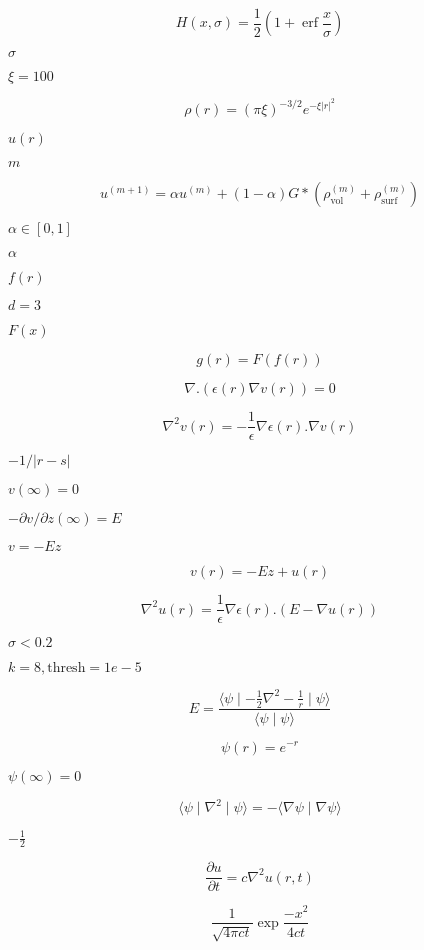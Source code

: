 \documentclass{article}
\begin{document}
\[ H(x,\sigma) = \frac{1}{2} \left( 1 + \mathop{\mathrm{erf}} \frac{x}{\sigma} \right) \]
\pagebreak

$\sigma$
\pagebreak

$\xi=100$
\pagebreak

\[ \rho(r) = \left(\pi \xi \right)^{-3/2} e^{-\xi |r|^2} \]
\pagebreak

$u(r)$
\pagebreak

$m$
\pagebreak

\[ u^{(m+1)} = \alpha u^{(m)} + (1-\alpha) G * \left(\rho^{(m)}_{\mbox{vol}} + \rho^{(m)}_{\mbox{surf}} \right) \]
\pagebreak

$ \alpha \in [0,1]$
\pagebreak

$\alpha$
\pagebreak

$f(r)$
\pagebreak

$d=3$
\pagebreak

$F(x)$
\pagebreak

\[ g(r) = F(f(r)) \]
\pagebreak

\[ \nabla . \left( \epsilon(r) \nabla v(r) \right) = 0 \]
\pagebreak

\[ \nabla^2 v(r) = - \frac{1}{\epsilon} \nabla \epsilon(r) . \nabla v(r) \]
\pagebreak

$-1 / |r-s|$
\pagebreak

$v(\infty)=0$
\pagebreak

$- \partial v / \partial z(\infty) = E$
\pagebreak

$v = - E z$
\pagebreak

\[ v(r) = - E z + u(r) \]
\pagebreak

\[ \nabla^2 u(r) = \frac{1}{\epsilon} \nabla \epsilon(r) . \left(E - \nabla u(r) \right) \]
\pagebreak

$\sigma<0.2$
\pagebreak

$k=8, \mbox{thresh}=1e-5$
\pagebreak

\[ E = \frac{\langle \psi \mid - \frac{1}{2} \nabla^2 - \frac{1}{r} \mid \psi \rangle}{\langle \psi \mid \psi \rangle} \]
\pagebreak

\[ \psi(r) = e^{-r} \]
\pagebreak

$ \psi(\infty)=0 $
\pagebreak

\[ \langle \psi \mid \nabla^2 \mid \psi \rangle = - \langle \nabla \psi \mid \nabla \psi \rangle \]
\pagebreak

$-\frac{1}{2}$
\pagebreak

\[ \frac{\partial u}{\partial t} = c \nabla^2 u(r,t) \]
\pagebreak

\[ \frac{1}{\sqrt{4 \pi c t}} \exp \frac{-x^2}{4 c t} \]
\pagebreak
\end{document}
